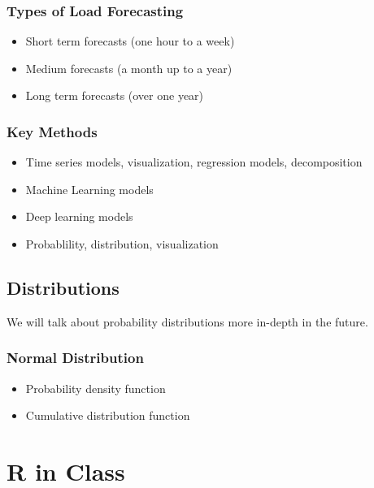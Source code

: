 \documentclass[12pt, a4paper]{report}
\begin{document}
  \subsection{Types of Load Forecasting}

  \begin{itemize}
    \item Short term forecasts (one hour to a week)
    \item Medium forecasts (a month up to a year)
    \item Long term forecasts (over one year)
  \end{itemize}

  \subsection{Key Methods}

  \begin{itemize}
    \item Time series models, visualization, regression models, decomposition
    \item Machine Learning models
    \item Deep learning models
    \item Probablility, distribution, visualization
  \end{itemize}

  \section{Distributions}

  We will talk about probability distributions more in-depth in the future.

  \subsection{Normal Distribution}

  \begin{itemize}
    \item Probability density function
    \item Cumulative distribution function
  \end{itemize}


  \chapter{R in Class}
  
\end{document}
